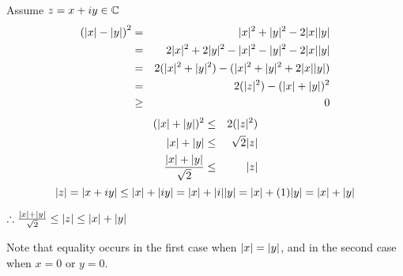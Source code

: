 \documentclass[letterpaper,12pt,fleqn]{article}
\begin{document}
\begin{theproof}
  Assume $z=x+iy\in\mathbb{C}$
  \begin{eqnarray*}
    \left(\lvert x\rvert-\lvert y\rvert\right)^2 &=& \lvert x\rvert^2+\lvert y\rvert^2-2\lvert x\rvert\lvert y\rvert \\
    &=& 2\lvert x\rvert^2+2\lvert y\rvert^2-\lvert x\rvert^2-\lvert y\rvert^2-2\lvert x\rvert\lvert y\rvert \\
    &=& 2(\lvert x\rvert^2+\lvert y\rvert^2)-(\lvert x\rvert^2+\lvert y\rvert^2+2\lvert x\rvert\lvert y\rvert) \\
    &=& 2(\lvert z\rvert^2)-(\lvert x\rvert+\lvert y\rvert)^2 \\
    &\ge& 0 \\
  \end{eqnarray*}
  \begin{eqnarray*}
    (\lvert x\rvert+\lvert y\rvert)^2 &\le& 2(\lvert z\rvert^2) \\
    \lvert x\rvert+\lvert y\rvert &\le& \sqrt{2}\lvert z\rvert \\
    \frac{\lvert x\rvert+\lvert y\rvert}{\sqrt{2}} &\le& \lvert z\rvert \\
  \end{eqnarray*}
  \[\lvert z\rvert=\lvert x+iy\rvert\le\lvert x\rvert+\lvert iy\rvert=\lvert x\rvert+\lvert i\rvert\lvert y\rvert=
  \lvert x\rvert+(1)\lvert y\rvert=\lvert x\rvert+\lvert y\rvert\]

  $\therefore\frac{\lvert x\rvert+\lvert y\rvert}{\sqrt{2}}\le\lvert z\rvert\le\lvert x\rvert+\lvert y\rvert$
\end{theproof}

Note that equality occurs in the first case when $\lvert x\rvert=\lvert y\rvert$, and in the
second case when $x=0$ or $y=0$.
\end{document}
